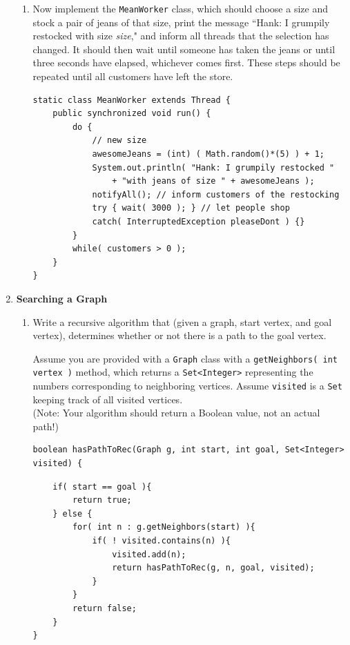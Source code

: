 \documentclass[11pt]{article}
\newenvironment{answer}{\large\lstset{basicstyle=\tiny\ttfamily}\color{white}}{}
\newenvironment{answer}{\large\lstset{basicstyle=\large\ttfamily}\color{red}}{}
\begin{document}
\begin{enumerate}
\begin{enumerate}
    \item Now implement the \texttt{MeanWorker} class, which should choose a size and
          stock a pair of jeans of that size, print the message ``Hank: I
          grumpily restocked with size \emph{size}," and inform all threads
          that the selection has changed. It should then wait until someone has
          taken the jeans or until three seconds have elapsed, whichever comes
          first. These steps should be repeated until all customers have left
          the store.

\begin{answer}
\begin{lstlisting}
static class MeanWorker extends Thread {
    public synchronized void run() {
        do {
			// new size
            awesomeJeans = (int) ( Math.random()*(5) ) + 1;
            System.out.println( "Hank: I grumpily restocked "
                + "with jeans of size " + awesomeJeans );
            notifyAll(); // inform customers of the restocking
            try { wait( 3000 ); } // let people shop
            catch( InterruptedException pleaseDont ) {}
        }
        while( customers > 0 );
    }
}
\end{lstlisting}
\end{answer}
    \end{enumerate}
    
\newpage
\item \textbf{Searching a Graph}
	\begin{enumerate}
		\item
			Write a recursive algorithm that (given a graph, start vertex, and goal vertex),
			determines whether or not there is a path to the goal vertex.

            Assume you are provided with a \texttt{Graph} class with a \texttt{getNeighbors( int vertex )} method, which returns a \texttt{Set\textless Integer\textgreater} representing the numbers corresponding to neighboring vertices. Assume \texttt{visited} is a \texttt{Set} keeping track of all visited vertices. \\
			(Note: Your algorithm should return a Boolean value, not an actual path!)
\begin{verbatim}
boolean hasPathToRec(Graph g, int start, int goal, Set<Integer> visited) {
\end{verbatim}
			
\begin{answer}
\begin{lstlisting}
	if( start == goal ){
		return true;
	} else {
		for( int n : g.getNeighbors(start) ){
			if( ! visited.contains(n) ){
				visited.add(n);
				return hasPathToRec(g, n, goal, visited);
			}
		}
		return false;
	}
}
\end{lstlisting}
\end{answer}
		            

\end{enumerate}
\end{enumerate}
\end{document}
